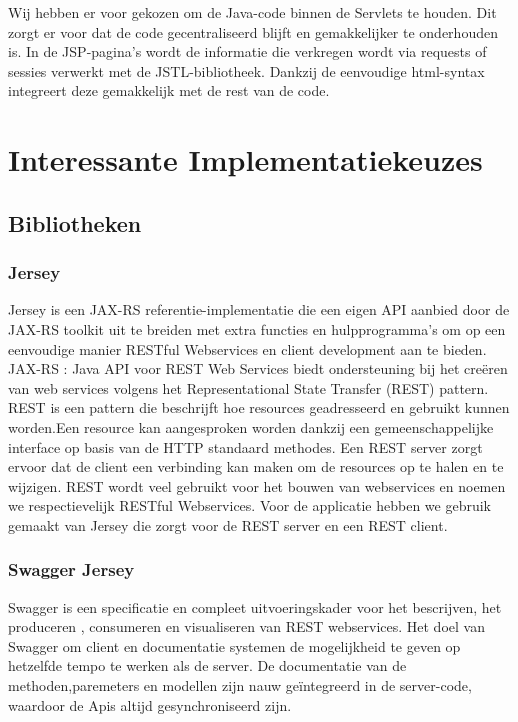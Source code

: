 \documentclass[pdftex,a4paper,12pt,twoside]{report}
\begin{document}
Wij hebben er voor gekozen om de Java-code binnen de Servlets te houden. Dit zorgt er voor dat de code gecentraliseerd blijft en gemakkelijker te onderhouden is. In de JSP-pagina's wordt de informatie die verkregen wordt via requests of sessies verwerkt met de JSTL-bibliotheek. Dankzij de eenvoudige html-syntax integreert deze gemakkelijk met de rest van de code.

\chapter{Interessante Implementatiekeuzes}
\section{Bibliotheken}
\subsection{Jersey}

Jersey is een JAX-RS referentie-implementatie die een eigen API aanbied door de JAX-RS toolkit uit te breiden met extra functies en hulpprogramma's om op een eenvoudige manier RESTful Webservices en client development aan te bieden.
JAX-RS : Java API voor REST Web Services biedt ondersteuning bij het creëren van web services volgens het Representational State Transfer (REST) pattern.
REST is een pattern die beschrijft hoe resources geadresseerd en gebruikt kunnen worden.Een resource kan aangesproken worden dankzij een gemeenschappelijke interface op basis van de HTTP standaard methodes.
Een REST server zorgt ervoor dat de client een verbinding kan maken om de resources op te halen en te wijzigen. REST wordt veel gebruikt voor het bouwen van webservices en noemen we respectievelijk RESTful Webservices.
Voor de applicatie hebben we gebruik gemaakt van Jersey die zorgt voor de REST server en een REST client.


\subsection{Swagger Jersey}
Swagger is een specificatie en compleet uitvoeringskader voor het bescrijven, het produceren , consumeren en visualiseren van REST webservices. Het doel van Swagger om client en documentatie systemen de mogelijkheid te geven op hetzelfde tempo te werken als de server. De documentatie van de methoden,paremeters en modellen zijn nauw geïntegreerd in de server-code, waardoor de Apis altijd gesynchroniseerd zijn.
\end{document}
